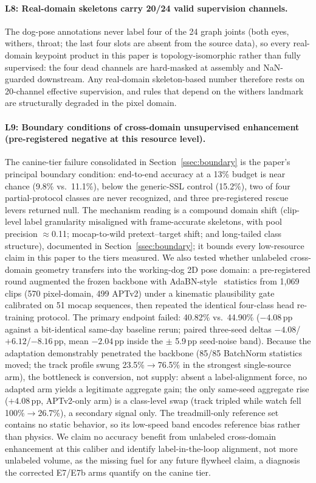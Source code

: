 \paragraph{L8: Real-domain skeletons carry 20/24 valid supervision channels.}
The dog-pose annotations never label four of the 24 graph joints (both eyes, withers, throat; the last four slots are absent from the source data), so every real-domain keypoint product in this paper is topology-isomorphic rather than fully supervised: the four dead channels are hard-masked at assembly and NaN-guarded downstream. Any real-domain skeleton-based number therefore rests on 20-channel effective supervision, and rules that depend on the withers landmark are structurally degraded in the pixel domain.

\paragraph{L9: Boundary conditions of cross-domain unsupervised enhancement (pre-registered negative at this resource level).}
The canine-tier failure consolidated in Section~\ref{ssec:boundary} is the paper's principal boundary condition: end-to-end accuracy at a 13\% budget is near chance (9.8\% vs.\ 11.1\%), below the generic-SSL control (15.2\%), two of four partial-protocol classes are never recognized, and three pre-registered rescue levers returned null. The mechanism reading is a compound domain shift (clip-level label granularity misaligned with frame-accurate skeletons, with pool precision $\approx$0.11; mocap-to-wild pretext--target shift; and long-tailed class structure), documented in Section~\ref{ssec:boundary}; it bounds every low-resource claim in this paper to the tiers measured.
We also tested whether unlabeled cross-domain geometry transfers into the working-dog 2D pose domain: a pre-registered round augmented the frozen backbone with AdaBN-style~\citep{li2017revisiting} statistics from 1{,}069 clips (570 pixel-domain, 499 APTv2) under a kinematic plausibility gate calibrated on 51 mocap sequences, then repeated the identical four-class head re-training protocol. The primary endpoint failed: 40.82\% vs.\ 44.90\% ($-4.08$\,pp against a bit-identical same-day baseline rerun; paired three-seed deltas $-4.08$/$+6.12$/$-8.16$\,pp, mean $-2.04$\,pp inside the $\pm$ 5.9\,pp seed-noise band). Because the adaptation demonstrably penetrated the backbone (85/85 BatchNorm statistics moved; the track profile swung 23.5\%$\to$76.5\% in the strongest single-source arm), the bottleneck is conversion, not supply: absent a label-alignment force, no adapted arm yields a legitimate aggregate gain; the only same-seed aggregate rise ($+4.08$\,pp, APTv2-only arm) is a class-level swap (track tripled while watch fell 100\%$\to$26.7\%), a secondary signal only. The treadmill-only reference set contains no static behavior, so its low-speed band encodes reference bias rather than physics. We claim no accuracy benefit from unlabeled cross-domain enhancement at this caliber and identify label-in-the-loop alignment, not more unlabeled volume, as the missing fuel for any future flywheel claim, a diagnosis the corrected E7/E7b arms quantify on the canine tier.

